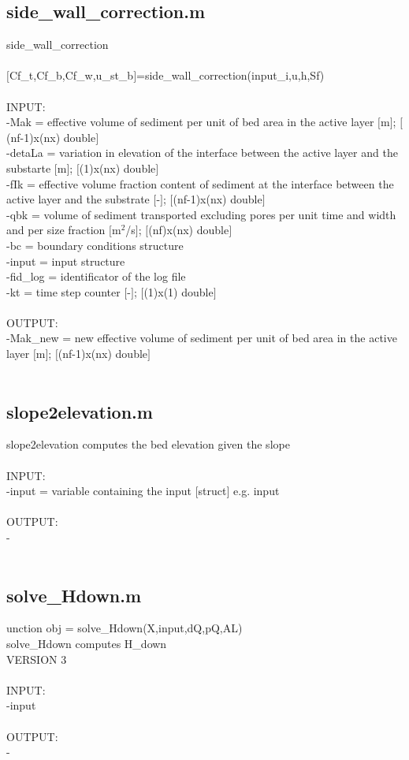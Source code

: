 \subsection{side\_wall\_correction.m}
side\_wall\_correction \\ 
 \\ 
$[$Cf\_t,Cf\_b,Cf\_w,u\_st\_b$]$=side\_wall\_correction(input\_i,u,h,Sf) \\ 
 \\ 
INPUT: \\ 
   -Mak = effective volume of sediment per unit of bed area in the active layer $[$m$]$; $[$(nf-1)x(nx) double$]$ \\ 
	-detaLa = variation in elevation of the interface between the active layer and the substarte $[$m$]$; $[$(1)x(nx) double$]$ \\ 
	-fIk = effective volume fraction content of sediment at the interface between the active layer and the substrate $[$-$]$; $[$(nf-1)x(nx) double$]$ \\ 
	-qbk = volume of sediment transported excluding pores per unit time and width and per size fraction $[$m$^2$/s$]$; $[$(nf)x(nx) double$]$ \\ 
	-bc = boundary conditions structure  \\ 
	-input = input structure \\ 
	-fid\_log = identificator of the log file \\ 
	-kt = time step counter $[$-$]$; $[$(1)x(1) double$]$ \\ 
 \\ 
OUTPUT: \\ 
   -Mak\_new = new effective volume of sediment per unit of bed area in the active layer $[$m$]$; $[$(nf-1)x(nx) double$]$ \\ 
 \\ 
\subsection{slope2elevation.m}
slope2elevation computes the bed elevation given the slope \\ 
 \\ 
INPUT: \\ 
   -input = variable containing the input $[$struct$]$ e.g. input \\ 
 \\ 
OUTPUT: \\ 
   - \\ 
 \\ 
\subsection{solve\_Hdown.m}
unction obj = solve\_Hdown(X,input,dQ,pQ,AL) \\ 
solve\_Hdown computes H\_down \\ 
 VERSION 3 \\ 
 \\ 
INPUT: \\ 
   -input \\ 
 \\ 
OUTPUT: \\ 
   - \\ 
 \\ 
